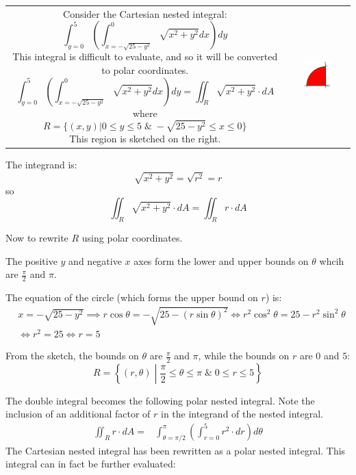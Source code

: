 \documentclass{article}
\begin{document}
\begin{tabular}{cc}
\parbox{0.5\textwidth}{
Consider the Cartesian nested integral:
\[\int_{y = 0}^5 \left(\int_{x = -\sqrt{25 - y^2}}^{0} \sqrt{x^2 + y^2} dx\right)dy\] 
This integral is difficult to evaluate, and so it will be converted to polar coordinates. 
\[\int_{y = 0}^5 \left(\int_{x = -\sqrt{25 - y^2}}^{0} \sqrt{x^2 + y^2} dx\right)dy = \iint_R \sqrt{x^2 + y^2} \cdot dA\] 
where 
\[R = \{(x,y)| 0 \leq y \leq 5 \;\&\; -\sqrt{25 - y^2} \leq x \leq 0\}\]
This region is sketched on the right.
} & \parbox{0.5\textwidth}{
\includegraphics[width = 0.5\textwidth]{Polar_region_7}
}
\end{tabular}

The integrand is:
\[\sqrt{x^2 + y^2} = \sqrt{r^2} = r\]
so
\[\iint_R \sqrt{x^2 + y^2} \cdot dA = \iint_R r \cdot dA\]

Now to rewrite \(R\) using polar coordinates. 

The positive \(y\) and negative \(x\) axes form the lower and upper bounds on \(\theta\) whcih are \(\frac{\pi}{2}\) and \(\pi\).

The equation of the circle (which forms the upper bound on \(r\)) is:
\begin{align*}
& x = -\sqrt{25 - y^2}   
\implies r\cos\theta = -\sqrt{25 - (r\sin\theta)^2}    
\iff r^2 \cos^2\theta = 25 - r^2 \sin^2\theta \\ 
& \iff r^2 = 25 
\iff r = 5 
\end{align*}     

From the sketch, the bounds on \(\theta\) are \(\frac{\pi}{2}\) and \(\pi\), while the bounds on \(r\) are \(0\) and \(5\):
\[R = \left\{(r,\theta)\middle| \frac{\pi}{2} \leq \theta \leq \pi \;\&\; 0 \leq r \leq 5 \right\}\]

The double integral becomes the following polar nested integral. Note the inclusion of an additional factor of \(r\) in the integrand of the nested integral.
\begin{align*}
\iint_R r \cdot dA = & \int_{\theta = \pi/2}^{\pi} \left(\int_{r = 0}^{5} r^2 \cdot dr\right)d\theta 
\end{align*}
The Cartesian nested integral has been rewritten as a polar nested integral. This integral can in fact be further evaluated:
\end{document}
